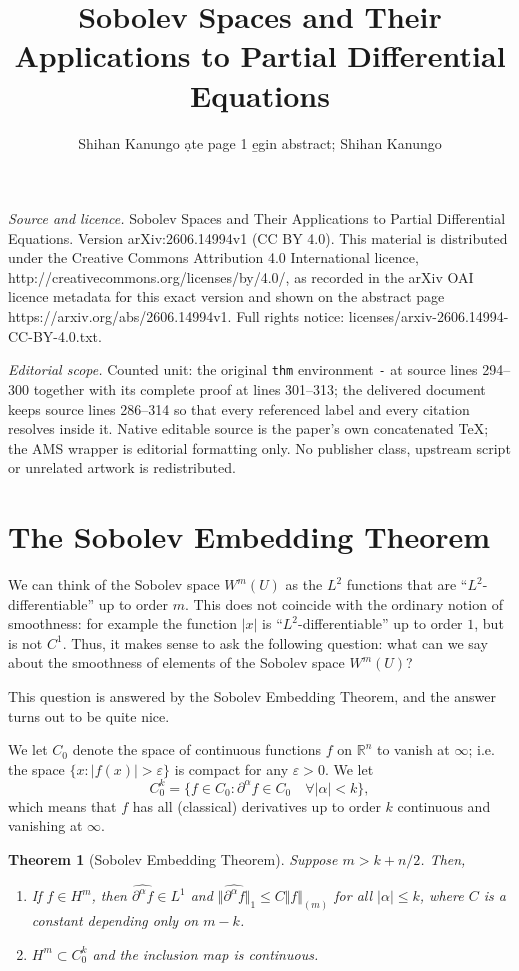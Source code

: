 \documentclass[10pt,a4paper]{amsart}
\newtheorem{thm}{Theorem}[section]
\numberwithin{equation}{section}
\newcommand{\R}{\mathbb{R}}                     %
\begin{document}
\title[Sobolev Spaces and Their Applications to Partial Differentia]{Sobolev Spaces and Their Applications to Partial Differential Equations}
\author{Shihan Kanungo ạte page 1 e̱gin abstract; Shihan Kanungo}
\date{}
\maketitle
\noindent\emph{Source and licence.} Sobolev Spaces and Their Applications to Partial Differential Equations. Version arXiv:2606.14994v1 (CC BY 4.0). This material is distributed under the Creative Commons Attribution 4.0 International licence, http://creativecommons.org/licenses/by/4.0/, as recorded in the arXiv OAI licence metadata for this exact version and shown on the abstract page https://arxiv.org/abs/2606.14994v1. Full rights notice: licenses/arxiv-2606.14994-CC-BY-4.0.txt.\par\smallskip
\noindent\textit{Editorial scope.} Counted unit: the original \texttt{thm} environment \texttt{-} at source lines 294--300 together with its complete proof at lines 301--313; the delivered document keeps source lines 286--314 so that every referenced label and every citation resolves inside it. Native editable source is the paper's own concatenated TeX; the AMS wrapper is editorial formatting only. No publisher class, upstream script or unrelated artwork is redistributed.
\section{The Sobolev Embedding Theorem}
We can think of the Sobolev space $W^m(U)$ as the $L^2$ functions that are ``$L^2$-differentiable'' up to order $m$. This does not coincide with the ordinary notion of smoothness: for example the function $|x|$ is ``$L^2$-differentiable'' up to order $1$, but is not $C^1$. Thus, it makes sense to ask the following question: what can we say about the smoothness of elements of the Sobolev space $W^m(U)$?

This question is answered by the Sobolev Embedding Theorem, and the answer turns out to be quite nice.

We let $C_0$ denote the space of continuous functions $f$ on $\R^n$ to vanish at $\infty$; i.e. the space $\{x: |f(x)|>\varepsilon\}$ is compact for any $\varepsilon>0$. We let
\[C_0^k = \{f\in C_0: \partial^\alpha f \in C_0 \quad\forall |\alpha|<k\},\]
which means that $f$ has all (classical) derivatives up to order $k$ continuous and vanishing at $\infty$.

\begin{thm}[Sobolev Embedding Theorem]
    Suppose $m>k+n/2$. Then,
    \begin{enumerate}
        \item[$(1)$] If $f\in H^m$, then $\widehat{\partial^\alpha f}\in L^1$ and $\Vert \widehat{\partial^\alpha f}\Vert_1 \le C \Vert f \Vert_{(m)}$ for all $|\alpha|\le k$, where $C$ is a constant depending only on $m-k$.
        \item[$(2)$] $H^m \subset C_0^k$ and the inclusion map is continuous.
    \end{enumerate}
\end{thm}
\end{document}
